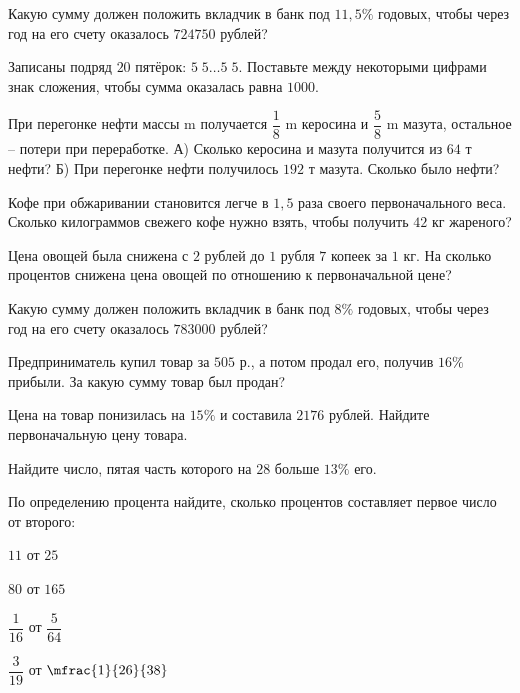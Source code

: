 	\begin{homework}[number=2]
		\begin{listofex}
		\item Какую сумму должен положить вкладчик в банк под \( 11,5\% \) годовых, чтобы через год на его счету оказалось \( 724750 \) рублей?
		\item Записаны подряд \( 20 \) пятёрок: \( 5\;5\dots5\;5 \). Поставьте между некоторыми цифрами знак сложения, чтобы сумма оказалась равна \( 1000 \).
		\item При перегонке нефти массы m получается \(\dfrac{1}{8}\) m керосина и \(\dfrac{5}{8} \) m мазута, остальное – потери при переработке. А) Сколько керосина и мазута получится из \(64\) т нефти? Б) При перегонке нефти получилось \(192\) т мазута. Сколько было нефти?
		\item Кофе при обжаривании становится легче в \(1,5\) раза своего первоначального веса. Сколько килограммов свежего кофе нужно взять, чтобы получить \(42\) кг жареного?
		\item Цена овощей была снижена с \(2\) рублей до \(1\) рубля \(7\) копеек за \(1\) кг. На сколько процентов снижена цена овощей по отношению к первоначальной цене?
		\item Какую сумму должен положить вкладчик в банк под \( 8\% \) годовых, чтобы через год на его счету оказалось \( 783 000 \) рублей?
		\item Предприниматель купил товар за \(505\) р., а потом продал его, получив \(16 \%\) прибыли. За какую сумму товар был продан?
		\item Цена на товар понизилась на \(15\%\) и составила \(2176\) рублей. Найдите первоначальную цену товара.
		\item Найдите число, пятая часть которого на \( 28 \) больше \( 13\% \) его.
		\item По определению процента найдите, сколько процентов составляет первое число от второго:
		\begin{enumcols}[itemcolumns=4]
			\item \( 11 \) от \( 25 \)
			\item \( 80 \) от \( 165 \)
			\item \( \dfrac{1}{16} \) от \( \dfrac{5}{64} \)
			\item \( \dfrac{3}{19} \) от \( \mfrac{1}{26}{38} \)
		\end{enumcols}
	\end{listofex}
\end{homework}
%
